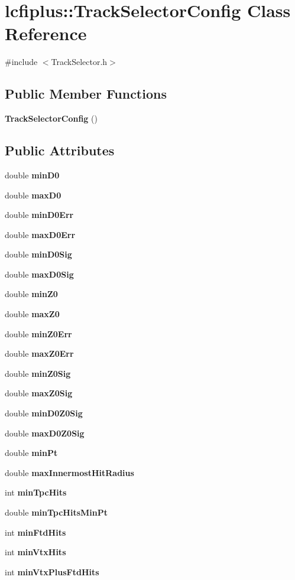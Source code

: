 \section{lcfiplus\+:\+:Track\+Selector\+Config Class Reference}
\label{classlcfiplus_1_1TrackSelectorConfig}


{\ttfamily \#include $<$Track\+Selector.\+h$>$}

\subsection*{Public Member Functions}
\begin{DoxyCompactItemize}
\item 
\textbf{ Track\+Selector\+Config} ()
\end{DoxyCompactItemize}
\subsection*{Public Attributes}
\begin{DoxyCompactItemize}
\item 
double \textbf{ min\+D0}
\item 
double \textbf{ max\+D0}
\item 
double \textbf{ min\+D0\+Err}
\item 
double \textbf{ max\+D0\+Err}
\item 
double \textbf{ min\+D0\+Sig}
\item 
double \textbf{ max\+D0\+Sig}
\item 
double \textbf{ min\+Z0}
\item 
double \textbf{ max\+Z0}
\item 
double \textbf{ min\+Z0\+Err}
\item 
double \textbf{ max\+Z0\+Err}
\item 
double \textbf{ min\+Z0\+Sig}
\item 
double \textbf{ max\+Z0\+Sig}
\item 
double \textbf{ min\+D0\+Z0\+Sig}
\item 
double \textbf{ max\+D0\+Z0\+Sig}
\item 
double \textbf{ min\+Pt}
\item 
double \textbf{ max\+Innermost\+Hit\+Radius}
\item 
int \textbf{ min\+Tpc\+Hits}
\item 
double \textbf{ min\+Tpc\+Hits\+Min\+Pt}
\item 
int \textbf{ min\+Ftd\+Hits}
\item 
int \textbf{ min\+Vtx\+Hits}
\item 
int \textbf{ min\+Vtx\+Plus\+Ftd\+Hits}
\end{DoxyCompactItemize}


